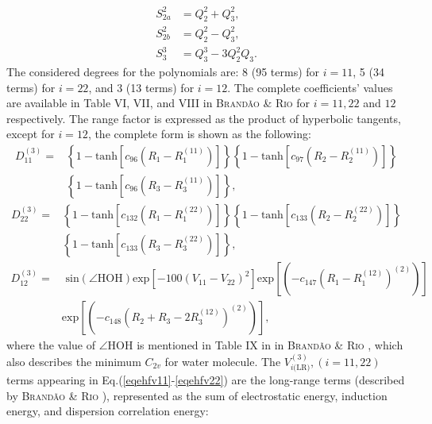 \documentclass[12pt]{article}
\begin{document}
\begin{equation}
    \begin{split}
        S^2_{2a} &= Q_2^2 + Q_3^2, \\
        S^2_{2b} &= Q_2^2 - Q_3^2, \\
        S^3_{3} &= Q_3^3 - 3Q_2^2Q_3.
    \end{split}
\end{equation}
The considered degrees for the polynomials are: 8 (95 terms) for $i=11$, 5 (34 terms) for $i=22$, and 3 (13 terms) for $i=12$. The complete coefficients' values are available in Table VI, VII, and VIII in \textsc{Brandão \& Rio} \cite{idx41} for $i=11,22$ and $12$ respectively. The range factor is expressed as the product of hyperbolic tangents, except for $i=12$, the complete form is shown as the following:
\begin{equation}
    \begin{split}
        D_{11}^{(3)} = &\left\{ 1-\text{tanh}\left[c_{96}(R_1-R_1^{(11)})\right] \right\} \left\{  1-\text{tanh}\left[c_{97}(R_2-R_2^{(11)})\right] \right\} \\ &\left\{  1-\text{tanh}\left[c_{96}(R_3-R_3^{(11)})\right] \right\},
    \end{split}
\end{equation}
\begin{equation}
    \begin{split}
        D_{22}^{(3)} = &\left\{ 1-\text{tanh}\left[c_{132}(R_1-R_1^{(22)})\right] \right\} \left\{  1-\text{tanh}\left[c_{133}(R_2-R_2^{(22)})\right] \right\} \\ &\left\{  1-\text{tanh}\left[c_{133}(R_3-R_3^{(22)})\right] \right\},
    \end{split}
\end{equation}
\begin{equation}
    \begin{split}
        D_{12}^{(3)} = &\text{ sin}(\angle\text{HOH})\text{exp}\left[-100(V_{11}-V_{22})^2\right]\text{exp}\left[(-c_{147}(R_1-R_1^{(12)})^{(2)})\right]\\
        &\text{exp}\left[(-c_{148}(R_2+R_3-2R_3^{(12)})^{(2)})\right],
    \end{split}
\end{equation}
where the value of $\angle\text{HOH}$ is mentioned in Table IX in in \textsc{Brandão \& Rio} \cite{idx41}, which also describes the minimum $C_{2v}$ for water molecule. The $V^{(3)}_{i\text{(LR)}}, (i=11,22)$ terms appearing in Eq.(\ref{eqehfv11}-\ref{eqehfv22}) are the long-range terms (described by \textsc{Brandão \& Rio} \cite{idx168}), represented as the sum of electrostatic energy, induction energy, and dispersion correlation energy:
\end{document}
